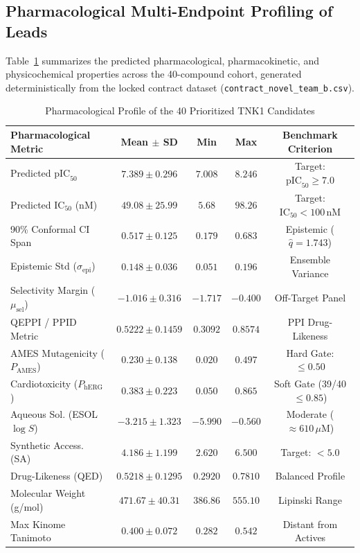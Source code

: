 \documentclass[journal]{IEEEtran}
\begin{document}
\subsection{Pharmacological Multi-Endpoint Profiling of Leads}
Table~\ref{tab:pharm_summary} summarizes the predicted pharmacological, pharmacokinetic, and physicochemical properties across the 40-compound cohort, generated deterministically from the locked contract dataset (\texttt{contract\_novel\_team\_b.csv}).

\begin{table}[!t]
\caption{Pharmacological Profile of the 40 Prioritized TNK1 Candidates}
\label{tab:pharm_summary}
\centering
\begin{tabular}{lcccc}
\toprule
\textbf{Pharmacological Metric} & \textbf{Mean $\pm$ SD} & \textbf{Min} & \textbf{Max} & \textbf{Benchmark Criterion} \\
\midrule
Predicted $\text{pIC}_{50}$ & $7.389 \pm 0.296$ & $7.008$ & $8.246$ & Target: $\text{pIC}_{50} \ge 7.0$ \\
Predicted $\text{IC}_{50}$ (nM) & $49.08 \pm 25.99$ & $5.68$ & $98.26$ & Target: $\text{IC}_{50} < 100\,\text{nM}$ \\
90\% Conformal CI Span & $0.517 \pm 0.125$ & $0.179$ & $0.683$ & Epistemic ($\hat{q}=1.743$) \\
Epistemic Std ($\sigma_{\text{epi}}$) & $0.148 \pm 0.036$ & $0.051$ & $0.196$ & Ensemble Variance \\
Selectivity Margin ($\mu_{\text{sel}}$) & $-1.016 \pm 0.316$ & $-1.717$ & $-0.400$ & Off-Target Panel \\
QEPPI / PPID Metric & $0.5222 \pm 0.1459$ & $0.3092$ & $0.8574$ & PPI Drug-Likeness \\
AMES Mutagenicity ($P_{\text{AMES}}$) & $0.230 \pm 0.138$ & $0.020$ & $0.497$ & Hard Gate: $\le 0.50$ \\
Cardiotoxicity ($P_{\text{hERG}}$) & $0.383 \pm 0.223$ & $0.050$ & $0.865$ & Soft Gate (39/40 $\le 0.85$) \\
Aqueous Sol. (ESOL $\log S$) & $-3.215 \pm 1.323$ & $-5.990$ & $-0.560$ & Moderate ($\approx 610\,\mu\text{M}$) \\
Synthetic Access. (SA) & $4.186 \pm 1.199$ & $2.620$ & $6.500$ & Target: $< 5.0$ \\
Drug-Likeness (QED) & $0.5218 \pm 0.1295$ & $0.2920$ & $0.7810$ & Balanced Profile \\
Molecular Weight (g/mol) & $471.67 \pm 40.31$ & $386.86$ & $555.10$ & Lipinski Range \\
Max Kinome Tanimoto & $0.400 \pm 0.072$ & $0.282$ & $0.542$ & Distant from Actives \\
\bottomrule
\end{tabular}
\end{table}
\end{document}
